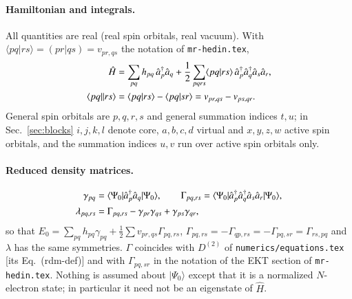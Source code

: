 \documentclass[aip,jcp,reprint,noshowkeys,superscriptaddress]{revtex4-1}
\newcommand{\cre}[1]{\Hat{a}_{#1}^{\dag}}
\newcommand{\ani}[1]{\Hat{a}_{#1}}
\begin{document}
\paragraph*{Hamiltonian and integrals.}
All quantities are real (real spin orbitals, real vacuum).  With
$\langle pq|rs\rangle=(pr|qs)=v_{pr,qs}$ the notation of \texttt{mr-hedin.tex},
\begin{align}
  \hat H&=\sum_{pq}h_{pq}\,\cre{p}\ani{q}
  +\frac12\sum_{pqrs}\langle pq|rs\rangle\,\cre{p}\cre{q}\ani{s}\ani{r},
  \nonumber\\
  \langle pq||rs\rangle&=\langle pq|rs\rangle-\langle pq|sr\rangle
  =v_{pr,qs}-v_{ps,qr}.
  \label{eq:H}
\end{align}
General spin orbitals are $p,q,r,s$ and general summation indices $t,u$;
in Sec.~\ref{sec:blocks} $i,j,k,l$ denote core, $a,b,c,d$ virtual and
$x,y,z,w$ active spin orbitals, and the summation indices $u,v$ run over
active spin orbitals only.

\paragraph*{Reduced density matrices.}
\begin{align}
  \gamma_{pq}&=\langle\Psi_0|\cre{p}\ani{q}|\Psi_0\rangle,
  \qquad
  \Gamma_{pq,rs}=\langle\Psi_0|\cre{p}\cre{q}\ani{s}\ani{r}|\Psi_0\rangle,
  \label{eq:rdm}\\
  \lambda_{pq,rs}&=\Gamma_{pq,rs}-\gamma_{pr}\gamma_{qs}+\gamma_{ps}\gamma_{qr},
  \label{eq:cumulant}
\end{align}
so that $E_0=\sum_{pq}h_{pq}\gamma_{pq}+\tfrac12\sum v_{pr,qs}\Gamma_{pq,rs}$,
$\Gamma_{pq,rs}=-\Gamma_{qp,rs}=-\Gamma_{pq,sr}=\Gamma_{rs,pq}$ and
$\lambda$ has the same symmetries.  $\Gamma$ coincides with $D^{(2)}$ of
\texttt{numerics/equations.tex} [its Eq.~(rdm-def)] and with
$\Gamma_{pq,sr}$ in the notation of the EKT section of \texttt{mr-hedin.tex}.
Nothing is assumed about $|\Psi_0\rangle$ except that it is a normalized
$N$-electron state; in particular it need not be an eigenstate of $\hat H$.
\end{document}
